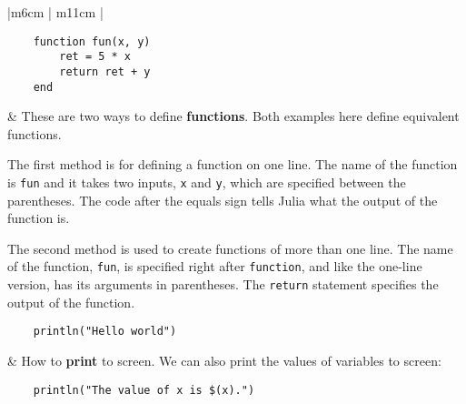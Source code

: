 \documentclass[]{article}
\begin{document}
\begin{longtable}{ |m{6cm}  | m{11cm} |}
\begin{verbatim}
    function fun(x, y)
        ret = 5 * x
        return ret + y
    end
	\end{verbatim}
	& These are two ways to define \textbf{functions}. Both examples here define
    equivalent functions.

    The first method is for defining a function on one line. The name of the
    function is \texttt{fun} and it takes two inputs, \texttt{x} and
    \texttt{y}, which are specified between the parentheses. The code after
    the equals sign tells Julia what the output of the function is.

    The second method is used to create functions of more than one line. The
    name of the function, \texttt{fun}, is specified right after
    \texttt{function}, and like the one-line version, has its arguments in
    parentheses. The \texttt{return} statement specifies the output of the
    function.
    \\\hline
\begin{verbatim}
    println("Hello world")
	\end{verbatim}
	& How to \textbf{print} to screen. We can also print the values of
    variables to screen:
    \begin{verbatim}
    println("The value of x is $(x).")
    \end{verbatim}
    \\\hline

\end{longtable}
\end{document}
